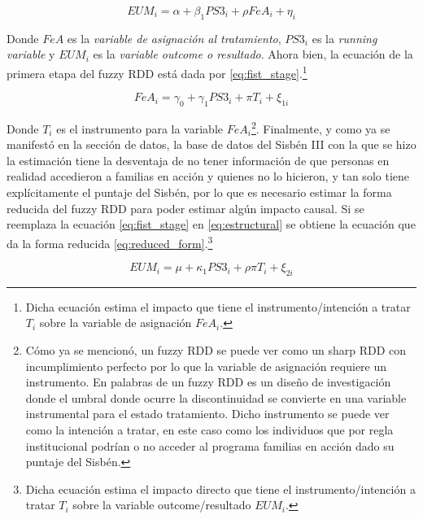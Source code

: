 \documentclass[AER]{AEA}
\begin{document}
\begin{equation}
    EUM_i = \alpha + \beta_1 PS3_i + \rho FeA_i + \eta_i
    \label{eq:estructural}
\end{equation}

Donde $FeA$ es la \textit{variable de asignación al tratamiento}, $PS3_i$ es la \textit{running variable} y $EUM_i$ es la \textit{variable outcome o resultado}. Ahora bien, la ecuación de la primera etapa del fuzzy RDD está dada por \ref{eq:fist_stage}.\footnote{Dicha ecuación estima el impacto que tiene el instrumento/intención a tratar $T_i$ sobre la variable de asignación $FeA_i$.}

\begin{equation}
    FeA_i = \gamma_0 +  \gamma_1 PS3_i + \pi T_i + \xi_{1i}
    \label{eq:fist_stage}
\end{equation}

Donde $T_i$ es el instrumento para la variable $FeA_i$\footnote{Cómo ya se mencionó, un fuzzy RDD se puede ver como un sharp RDD con incumplimiento perfecto por lo que la variable de asignación requiere un instrumento. En palabras de \cite{Angrist2008MostlyCompanion} un fuzzy RDD es un diseño de investigación donde el umbral donde ocurre la discontinuidad se convierte en una variable instrumental para el estado tratamiento. Dicho instrumento se puede ver como la intención a tratar, en este caso como los individuos que por regla institucional podrían o no acceder al programa familias en acción dado su puntaje del Sisbén.}. Finalmente, y como ya se manifestó en la sección de datos, la base de datos del Sisbén III con la que se hizo la estimación tiene la desventaja de no tener información de que personas en realidad accedieron a familias en acción y quienes no lo hicieron, y tan solo tiene explícitamente el puntaje del Sisbén, por lo que es necesario estimar la forma reducida del fuzzy RDD para poder estimar algún impacto causal. Si se reemplaza la ecuación \ref{eq:fist_stage} en \ref{eq:estructural} se obtiene la ecuación que da la forma reducida \ref{eq:reduced_form}.\footnote{Dicha ecuación estima el impacto directo que tiene el instrumento/intención a tratar $T_i$ sobre la variable outcome/resultado $EUM_i$.}

\begin{equation}
    EUM_i = \mu + \kappa_1 PS3_i + \rho \pi T_i + \xi_{2i}
    \label{eq:reduced_form}
\end{equation}
\end{document}
